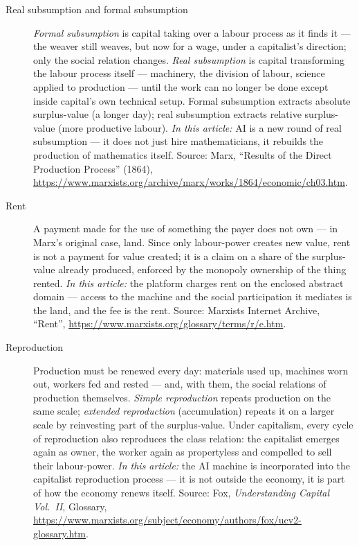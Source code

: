 \documentclass[11pt]{article}
\begin{document}
\begin{description}
\item[Real subsumption and formal subsumption] \emph{Formal subsumption}
is capital taking over a labour process as it finds it --- the weaver
still weaves, but now for a wage, under a capitalist's direction; only
the social relation changes. \emph{Real subsumption} is capital
transforming the labour process itself --- machinery, the division of
labour, science applied to production --- until the work can no longer
be done except inside capital's own technical setup. Formal subsumption
extracts absolute surplus-value (a longer day); real subsumption
extracts relative surplus-value (more productive labour). \emph{In this
article:} AI is a new round of real subsumption --- it does not just
hire mathematicians, it rebuilds the production of mathematics itself.
Source: Marx, ``Results of the Direct Production Process'' (1864),
\url{https://www.marxists.org/archive/marx/works/1864/economic/ch03.htm}.

\item[Rent] A payment made for the use of something the payer does not
own --- in Marx's original case, land. Since only labour-power creates
new value, rent is not a payment for value created; it is a claim on a
share of the surplus-value already produced, enforced by the monopoly
ownership of the thing rented. \emph{In this article:} the platform
charges rent on the enclosed abstract domain --- access to the machine
and the social participation it mediates is the land, and the fee is
the rent. Source: Marxists Internet Archive, ``Rent'',
\url{https://www.marxists.org/glossary/terms/r/e.htm}.

\item[Reproduction] Production must be renewed every day: materials used
up, machines worn out, workers fed and rested --- and, with them, the
social relations of production themselves. \emph{Simple reproduction}
repeats production on the same scale; \emph{extended reproduction}
(accumulation) repeats it on a larger scale by reinvesting part of the
surplus-value. Under capitalism, every cycle of reproduction also
reproduces the class relation: the capitalist emerges again as owner,
the worker again as propertyless and compelled to sell their
labour-power. \emph{In this article:} the AI machine is incorporated
into the capitalist reproduction process --- it is not outside the
economy, it is part of how the economy renews itself. Source: Fox,
\emph{Understanding Capital Vol.~II}, Glossary,
\url{https://www.marxists.org/subject/economy/authors/fox/ucv2-glossary.htm}.


\end{description}
\end{document}
